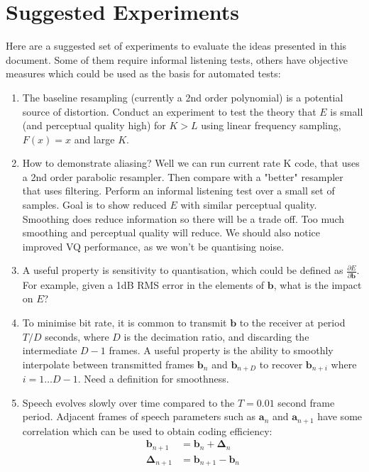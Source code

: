 \documentclass{article}
\begin{document}
\section{Suggested Experiments}
 
Here are a suggested set of experiments to evaluate the ideas presented in this document.  Some of them require informal listening tests, others have objective measures which could be used as the basis for automated tests:

\begin{enumerate}

\item The baseline resampling (currently a 2nd order polynomial) is a potential source of distortion.  Conduct an experiment to test the theory that $E$ is small (and perceptual quality high) for $K>L$ using linear frequency sampling, $F(x)=x$ and large $K$.

\item How to demonstrate aliasing?  Well we can run current rate K code, that uses a 2nd order parabolic resampler.  Then compare with a "better" resampler that uses filtering.  Perform an informal listening test over a small set of samples.  Goal is to show reduced $E$ with similar perceptual quality.  Smoothing does reduce information so there will be a trade off.  Too much smoothing and perceptual quality will reduce.  We should also notice improved VQ performance, as we won't be quantising noise.

\item A useful property is sensitivity to quantisation, which could be defined as $\frac{\partial E}{\partial \mathbf{b}}$. For example, given a 1dB RMS error in the elements of $\mathbf{b}$, what is the impact on $E$?

\item To minimise bit rate, it is common to transmit $\mathbf{b}$ to the receiver at period $T/D$ seconds, where $D$ is the decimation ratio, and discarding the intermediate $D-1$ frames. A useful property is the ability to smoothly interpolate between transmitted frames $\mathbf{b}_n$ and $\mathbf{b}_{n+D}$ to recover $\mathbf{b}_{n+i}$ where $i=1 \ldots D-1$.  Need a definition for smoothness.

\item Speech evolves slowly over time compared to the $T=0.01$ second frame period.  Adjacent frames of speech parameters such as $\mathbf{a}_n$ and $\mathbf{a}_{n+1}$ have some correlation which can be used to obtain coding efficiency:
\begin{equation} \label{eq:delta}
\begin{split}
\mathbf{b}_{n+1} & = \mathbf{b}_{n} + \mathbf{\Delta}_n \\
\mathbf{\Delta}_{n+1} & = \mathbf{b}_{n+1} - \mathbf{b}_{n}
\end{split}
\end{equation}


\end{enumerate}
\end{document}

